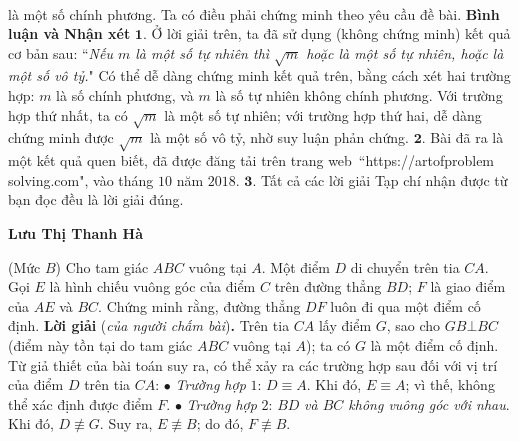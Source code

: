 \begin{multicols}{2}
\begin{align*}
	\end{align*}
	là một số chính phương.
	\vskip 0.05cm
	Ta có điều phải chứng minh theo yêu cầu đề bài.
	\vskip 0.05cm
	\textbf{\color{thachthuctoanhoc}Bình luận và Nhận xét}
	\vskip 0.05cm
	$\pmb{1.}$ Ở lời giải trên, ta đã sử dụng (không chứng minh) kết quả cơ bản sau:
	\vskip 0.05cm
	``\textit{Nếu $m$ là một số tự nhiên thì  $\sqrt{m}$ hoặc là một số tự nhiên, hoặc là một số vô tỷ.}"
	\vskip 0.05cm
	Có thể dễ dàng chứng minh kết quả trên, bằng cách xét hai trường hợp: $m$ là số chính phương, và $m$ là số tự nhiên không chính phương. Với trường hợp thứ nhất, ta có $\sqrt{m}$ là một số tự nhiên; với trường hợp thứ hai, dễ dàng chứng minh được  $\sqrt{m}$ là một số vô tỷ, nhờ suy luận phản chứng.
	\vskip 0.05cm
	$\pmb{2.}$ Bài đã ra là một kết quả quen biết, đã được đăng tải trên trang web~``{\small\color{thachthuctoanhoc}https://artofproblem\\solving.com}",
	vào tháng $10$ năm $2018$.
	\vskip 0.05cm
	$\pmb{3.}$ Tất cả các lời giải Tạp chí nhận được từ bạn đọc đều là lời giải đúng.
	\begin{flushright}
		\textbf{\color{thachthuctoanhoc}Lưu Thị Thanh Hà}
	\end{flushright}
	{}
	(Mức $B$) Cho tam giác $ABC$ vuông tại $A$. Một điểm $D$ di chuyển trên tia $CA$. Gọi $E$ là hình chiếu vuông góc của điểm $C$ trên đường thẳng $BD$; $F$ là giao điểm của $AE$ và $BC$. Chứng minh rằng, đường thẳng $DF$ luôn đi qua một điểm cố định.
	\vskip 0.05cm
	\textbf{\color{thachthuctoanhoc}Lời giải} (\textit{của người chấm bài})\textbf{\color{thachthuctoanhoc}.}
	\vskip 0.05cm
	Trên tia $CA$ lấy điểm $G$, sao cho $GB \bot BC$ (điểm này tồn tại do tam giác $ABC$ vuông tại $A$); ta có $G$ là một điểm cố định.
	\vskip 0.05cm
	Từ giả thiết của bài toán suy ra, có thể xảy ra các trường hợp sau đối với vị trí của điểm $D$ trên tia $CA$:
	\vskip 0.05cm
	$\bullet$ \textit{Trường hợp} $1$: $D \equiv A$.
	\vskip 0.05cm
	Khi đó, $E \equiv A$; vì thế, không thể xác định được điểm $F$.
	\vskip 0.05cm
	$\bullet$ \textit{Trường hợp} $2$: $BD$ \textit{và $BC$ không vuông góc với nhau}.
	\vskip 0.05cm
	Khi đó, $D \not\equiv G$.  Suy ra, $E \not\equiv B$; do đó, $F \not\equiv B$.  
	\begin{figure}[H]
		\centering
		\vspace*{-5pt}
		\captionsetup{labelformat= empty, justification=centering}

\end{figure}
\end{multicols}
